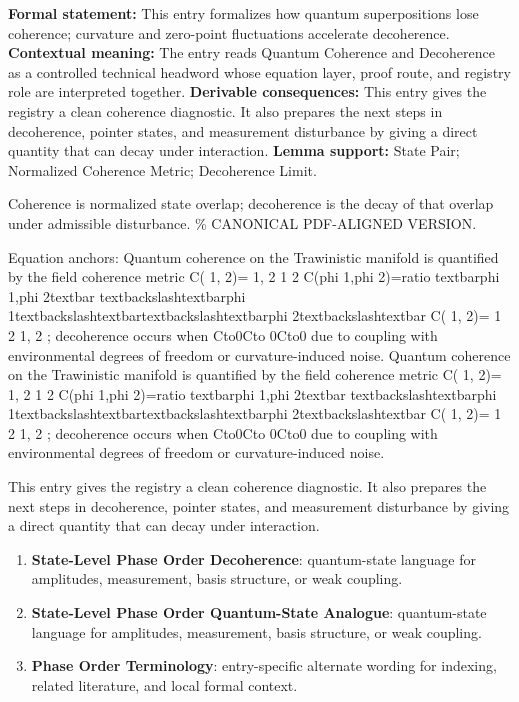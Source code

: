 \begingroup\footnotesize\setlength{\emergencystretch}{3em}\sloppy
\textbf{Formal statement:} This entry formalizes how quantum superpositions lose coherence; curvature and zero-point fluctuations accelerate decoherence. \textbf{Contextual meaning:} The entry reads Quantum Coherence and Decoherence as a controlled technical headword whose equation layer, proof route, and registry role are interpreted together. \textbf{Derivable consequences:} This entry gives the registry a clean coherence diagnostic. It also prepares the next steps in decoherence, pointer states, and measurement disturbance by giving a direct quantity that can decay under interaction. \textbf{Lemma support:} State Pair; Normalized Coherence Metric; Decoherence Limit.\par
\endgroup

Coherence is normalized state overlap; decoherence is the decay of that overlap under admissible disturbance. \% CANONICAL PDF-ALIGNED VERSION.

Equation anchors: Quantum coherence on the Trawinistic manifold is quantified by the field coherence metric C( 1, 2)=  1, 2   1   2 C(phi 1,phi 2)=ratio textbarphi 1,phi 2textbar textbackslashtextbarphi 1textbackslashtextbartextbackslashtextbarphi 2textbackslashtextbar C( 1, 2)=  1   2   1, 2 ; decoherence occurs when Cto0Cto 0Cto0 due to coupling with environmental degrees of freedom or curvature-induced noise. Quantum coherence on the Trawinistic manifold is quantified by the field coherence metric C( 1, 2)=  1, 2   1   2 C(phi 1,phi 2)=ratio textbarphi 1,phi 2textbar textbackslashtextbarphi 1textbackslashtextbartextbackslashtextbarphi 2textbackslashtextbar C( 1, 2)=  1   2   1, 2 ; decoherence occurs when Cto0Cto 0Cto0 due to coupling with environmental degrees of freedom or curvature-induced noise.

This entry gives the registry a clean coherence diagnostic. It also prepares the next steps in decoherence, pointer states, and measurement disturbance by giving a direct quantity that can decay under interaction.
\endgroup

\begingroup\footnotesize\sloppy
\begin{enumerate}[leftmargin=1.35em,itemsep=1pt,topsep=1pt,parsep=0pt]
\item \textbf{State-Level Phase Order Decoherence}: quantum-state language for amplitudes, measurement, basis structure, or weak coupling.
\item \textbf{State-Level Phase Order Quantum-State Analogue}: quantum-state language for amplitudes, measurement, basis structure, or weak coupling.
\item \textbf{Phase Order Terminology}: entry-specific alternate wording for indexing, related literature, and local formal context.
\end{enumerate}
\endgroup


